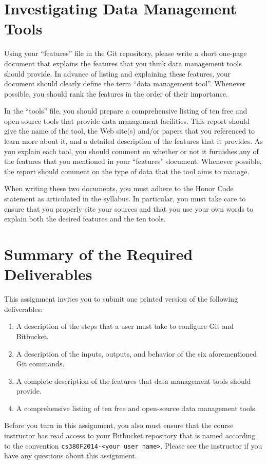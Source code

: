 \section*{Investigating Data Management Tools}

Using your ``features'' file in the Git repository, please write a short one-page document that explains the features
that you think data management tools should provide.  In advance of listing and explaining these features, your
document should clearly define the term ``data management tool''. Whenever possible, you should rank the features in the
order of their importance.

In the ``tools'' file, you should prepare a comprehensive listing of ten free and open-source tools that provide data
management facilities.  This report should give the name of the tool, the Web site(s) and/or papers that you referenced
to learn more about it, and a detailed description of the features that it provides.  As you explain each tool, you
should comment on whether or not it furnishes any of the features that you mentioned in your ``features'' document.
Whenever possible, the report should comment on the type of data that the tool aims to manage. 

When writing these two documents, you must adhere to the Honor Code statement as articulated in the syllabus.  In
particular, you must take care to ensure that you properly cite your sources and that you use your own words to explain
both the desired features and the ten tools. 

\section*{Summary of the Required Deliverables}

  This assignment invites you to submit one printed version of the following deliverables:

  \vspace*{-.05in}
  \begin{enumerate}
    \setlength{\itemsep}{0pt}
    \item A description of the steps that a user must take to configure Git and Bitbucket.
    \item A description of the inputs, outputs, and behavior of the six aforementioned Git commands.
    \item A complete description of the features that data management tools should provide.
    \item A comprehensive listing of ten free and open-source data management tools.
  \end{enumerate}

\vspace*{-.1in} 

Before you turn in this assignment, you also must ensure that the course instructor has read access to your Bitbucket
repository that is named according to the convention {\tt cs380F2014-<your user name>}.  Please see the instructor if
you have any questions about this assignment. 





